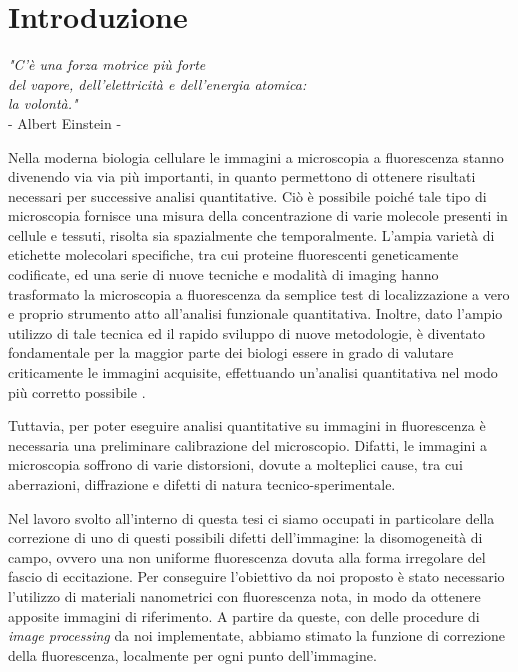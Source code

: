 \clearpage{\pagestyle{empty}\cleardoublepage}

\chapter*{Introduzione} 

\begin{flushright}\begin{small}\textit{"C'è una forza motrice più forte\\ del vapore, dell'elettricità e dell'energia atomica:\\ la volontà."}\\
- Albert Einstein -\\
\end{small}\end{flushright}

Nella moderna biologia cellulare le immagini a microscopia a fluorescenza stanno divenendo via via più importanti, in quanto permettono di ottenere risultati necessari per successive analisi quantitative.
Ciò è possibile poiché tale tipo di microscopia fornisce una misura della concentrazione di varie molecole presenti in cellule e tessuti, risolta sia spazialmente che temporalmente.
L'ampia varietà di etichette molecolari specifiche, tra cui proteine fluorescenti geneticamente codificate, ed una serie di nuove tecniche e modalità di imaging hanno trasformato la microscopia a fluorescenza da semplice test di localizzazione a vero e proprio strumento atto all'analisi funzionale quantitativa.
Inoltre, dato l'ampio utilizzo di tale tecnica ed il rapido sviluppo di nuove metodologie, è diventato fondamentale per la maggior parte dei biologi essere in grado di valutare criticamente le immagini acquisite, effettuando un'analisi quantitativa nel modo più corretto possibile \cite{fluo}.

Tuttavia, per poter eseguire analisi quantitative su immagini in fluorescenza è necessaria una preliminare calibrazione del microscopio.
Difatti, le immagini a microscopia soffrono di varie distorsioni, dovute a molteplici cause, tra cui aberrazioni, diffrazione e difetti di natura tecnico-sperimentale.

Nel lavoro svolto all'interno di questa tesi ci siamo occupati in particolare della correzione di uno di questi possibili difetti dell'immagine: la disomogeneità di campo, ovvero una non uniforme fluorescenza dovuta alla forma irregolare del fascio di eccitazione. 
Per conseguire l'obiettivo da noi proposto è stato necessario l'utilizzo di materiali nanometrici con fluorescenza nota, in modo da ottenere apposite immagini di riferimento. 
A partire da queste, con delle procedure di \textit{image processing} da noi implementate, abbiamo stimato la funzione di correzione della fluorescenza, localmente per ogni punto dell'immagine.

